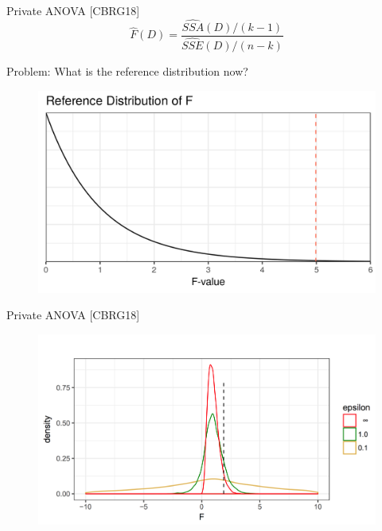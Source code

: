 \documentclass{beamer}
\newcommand{\sse}{\textit{SSE}\xspace}
\newcommand{\ssa}{\textit{SSA}\xspace}
\begin{document}
\begin{frame}{Private ANOVA [CBRG18]}
$$\widehat{F}(D) = \frac{\widehat{\ssa}(D)/(k-1)}{\widehat{\sse}(D)/(n-k)}$$
\bigskip

 \pause
 \centering
Problem: What is the reference distribution now? \pause
\begin{figure}
\includegraphics[scale=0.7]{simulation/null-dist}
\end{figure}
\end{frame}


\begin{frame}{Private ANOVA [CBRG18]}
\begin{figure}
  \includegraphics[scale=0.35]{images/noisy-ref-dist}
\end{figure} 
\end{frame}
\end{document}
